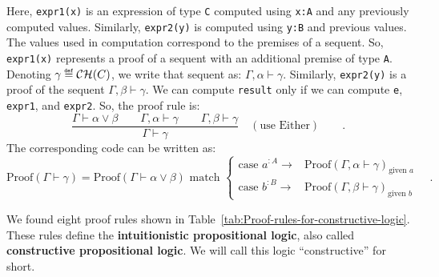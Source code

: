 \noindent Here, \lstinline!expr1(x)! is an expression of type \lstinline!C!
computed using \lstinline!x:A! and any previously computed values.
Similarly, \lstinline!expr2(y)! is computed using \lstinline!y:B!
and previous values. The values used in computation correspond to
the premises of a sequent. So, \lstinline!expr1(x)! represents a
proof of a sequent with an additional premise of type \lstinline!A!.
Denoting $\gamma\triangleq{\cal CH}(C)$, we write that sequent as:
$\Gamma,\alpha\vdash\gamma$. Similarly, \lstinline!expr2(y)! is
a proof of the sequent $\Gamma,\beta\vdash\gamma$. We can compute
\lstinline!result! only if we can compute \lstinline!e!, \lstinline!expr1!,
and \lstinline!expr2!. So, the proof rule is: 
\[
\frac{\Gamma\vdash\alpha\vee\beta\quad\quad\Gamma,\alpha\vdash\gamma\quad\quad\Gamma,\beta\vdash\gamma}{\Gamma\vdash\gamma}\quad(\text{use Either})\quad\quad.
\]
The corresponding code can be written as:
\[
\text{Proof}\left(\Gamma\vdash\gamma\right)=\text{Proof}\left(\Gamma\vdash\alpha\vee\beta\right)\text{ match }\begin{cases}
\text{case }a^{:A}\rightarrow & \text{Proof}\left(\Gamma,\alpha\vdash\gamma\right)_{\text{given }a}\\
\text{case }b^{:B}\rightarrow & \text{Proof}\left(\Gamma,\beta\vdash\gamma\right)_{\text{given }b}
\end{cases}\quad.
\]

We found eight proof rules shown in Table~\ref{tab:Proof-rules-for-constructive-logic}.
These rules define the \textbf{intuitionistic
propositional logic}, also called \textbf{constructive
propositional logic}. We will call this logic \textsf{``}constructive\textsf{''} for
short.


